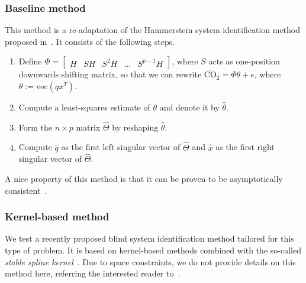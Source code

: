 \documentclass{article}
\begin{document}
\subsubsection{Baseline method}
This method is a re-adaptation of the Hammerstein system identification method
proposed in~\cite{bai1998optimal}. It consists of the following steps.
\begin{enumerate}
\item Define $\Phi = \begin{bmatrix}H & SH & S^2H & \dots
  &S^{p-1}H\end{bmatrix}$, where  $S$ acts as one-position downwards shifting matrix, so that we can rewrite $\overline{\textrm{CO}}_2 = \Phi \theta  + e$, where $\theta := \mathrm{vec}(qx^T)$.
\item Compute a least-squares estimate of $\theta$ and denote it by $\hat \theta$.
\item Form the $n \times p$ matrix $\hat \Theta$ by reshaping $\hat \theta$.
\item Compute $\hat q$ as the first left singular vector of $\hat \Theta$ and $\hat x$ as the first right singular vector of $\hat \Theta$.
\end{enumerate}
A nice property of this method is that it can be proven to be asymptotically
consistent~\cite{bai1998optimal}.

\subsubsection{Kernel-based method}
We test a recently proposed blind system identification method tailored for
this type of problem. It is based on kernel-based methods combined with the
so-called \emph{stable spline kernel}~\cite{pillonetto2014kernel}. Due to
space constraints, we do not provide details on this method here, referring the
interested reader to~\cite{bottegal2015blind}.
\end{document}
